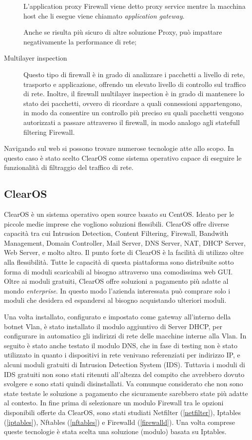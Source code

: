 \begin{description}
    L'application proxy Firewall viene detto proxy service mentre la macchina host che li esegue viene chiamato \textit{application gateway}.

    Anche se risulta più sicuro di altre soluzione Proxy, può impattare negativamente la performance di rete;
    \item[Multilayer inspection] Questo tipo di firewall è in grado di analizzare i pacchetti a livello di rete, trasporto e applicazione, offrendo un elevato livello di controllo sul traffico di rete. Inoltre, il firewall multilayer inspection è in grado di mantenere lo stato dei pacchetti, ovvero di ricordare a quali connessioni appartengono, in modo da consentire un controllo più preciso su quali pacchetti vengono autorizzati a passare attraverso il firewall, in modo analogo agli statefull filtering Firewall.


\end{description}
Navigando sul web si possono trovare numerose tecnologie atte allo scopo. In questo caso è stato scelto ClearOS come sistema operativo capace di eseguire le funzionalità di filtraggio del traffico di rete. 
\subsection{ClearOS}
\label{ClearOS}
ClearOS \cite{clearos} è un sistema operativo open source basato su CentOS. Ideato per le piccole medie imprese che vogliono soluzioni flessibili. ClearOS offre diverse capacità tra cui Intrusion Detection, Content Filtering, Firewall, Bandwith Management, Domain Controller, Mail Server, DNS Server, NAT, DHCP Server, Web Server, e molto altro.
Il punto forte di ClearOS è la facilità di utilizzo oltre alla flessibilità. Tutte le capacità di questa piattaforma sono distribuite sotto forma di moduli scaricabili al bisogno attraverso una comodissima web GUI. Oltre ai moduli gratuiti, ClearOS offre soluzioni a pagamento più adatte al mondo \textit{enterprise}. In questo modo l'azienda interessata può comprare solo i moduli che desidera ed espandersi al bisogno acquistando ulteriori moduli. 

Una volta installato, configurato e impostato come gateway all'interno della botnet Vlan, è stato installato il modulo aggiuntivo di Server DHCP, per configurare in automatico gli indirizzi di rete delle macchine interne alla Vlan.
In seguito è stato anche testato il modulo DNS, che in fase di testing non è stato utilizzato in quanto i dispositivi in rete venivano referenziati per indirizzo IP, e alcuni moduli gratuiti di Intrusion Detection System (IDS). Tuttavia i moduli di IDS gratuiti non sono stati ritenuti all'altezza del compito che avrebbero dovuto svolgere e sono stati quindi disinstallati. Va comunque considerato che non sono state testate le soluzione a pagamento che sicuramente sarebbero state più adatte al contesto. 
In fine prima di selezionare un modulo Firewall tra le opzioni disponibili offerte da  ClearOS, sono stati studiati Netfilter (\ref{netfilter}), Iptables (\ref{iptables}), Nftables (\ref{nftables}) e Firewalld (\ref{firewalld}). Una volta comprese queste tecnologie è stata scelta una soluzione (modulo) basata su Iptables.

